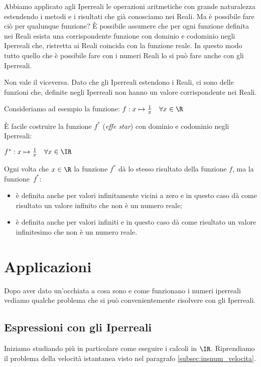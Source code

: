 Abbiamo applicato agli Iperreali le operazioni aritmetiche con grande 
naturalezza estendendo i metodi e i risultati che già conosciamo nei Reali. 
Ma è possibile fare ciò per qualunque funzione? 
È possibile assumere che per ogni funzione definita nei Reali esista una 
corrispondente funzione con dominio e codominio negli Iperreali che, ristretta 
ai Reali coincida con la funzione reale.
In questo modo tutto quello che è possibile fare con i numeri Reali lo si può 
fare anche con gli Iperreali.

\begin{osservazione}
 Non vale il viceversa. Dato che gli Iperreali estendono i Reali, ci sono delle 
funzioni che, definite negli Iperreali non hanno un valore corrispondente nei 
Reali.

\begin{esempio}
 Consideriamo ad esempio la funzione: 
$f: x \mapsto \frac{1}{x} \quad \forall x \in \R$

È facile costruire la funzione $f^*$ (\emph{effe star}) con dominio e codominio 
negli Iperreali:

$f^*: x \mapsto \frac{1}{x} \quad \forall x \in \IR$

Ogni volta che $x \in \R$ la funzione $f^*$ dà lo stesso risultato della 
funzione $f$, ma la funzione~$f^*$:
\begin{itemize}
 \item 
è definita anche per valori infinitamente vicini a zero e 
in questo caso dà come risultato un valore infinito che non è un numero reale;
 \item 
è definita anche per valori infiniti e
in questo caso dà come risultato un valore infinitesimo che non è un numero 
reale. 
\end{itemize}
\end{esempio}
\end{osservazione}

\section{Applicazioni}
\label{sec:insnum_applicazioni}

Dopo aver dato un'occhiata a cosa sono e come funzionano i numeri iperreali 
vediamo qualche problema che si può convenientemente risolvere con gli 
Iperreali.

\subsection{Espressioni con gli Iperreali}
\label{subsec:insnum_espressioni}
Iniziamo studiando più in particolare come eseguire i calcoli in 
\(\IR\). 
Riprendiamo il problema della velocità istantanea visto nel paragrafo 
\ref{subsec:insnum_velocita}.

